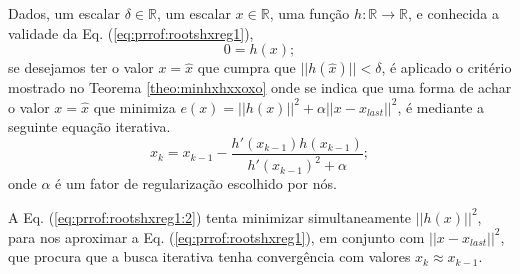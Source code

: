 \begin{myproofT}\label{proof:theo:rootshxreg}
Dados,
um escalar $\delta \in \mathbb{R}$, 
um escalar $x \in \mathbb{R}$, 
uma função $h:\mathbb{R} \rightarrow \mathbb{R}$, e 
conhecida a validade da Eq. (\ref{eq:prrof:rootshxreg1}),
\begin{equation}\label{eq:prrof:rootshxreg1}
0=h(x);
\end{equation}
se desejamos ter o valor $x=\hat{x}$ que cumpra que $||h(\hat{x})||<\delta$, 
é aplicado o critério mostrado no Teorema \ref{theo:minhxhxxoxo} onde se indica que uma forma de achar o valor 
$x=\hat{x}$ que minimiza $e(x)=||h(x)||^2+\alpha||x-x_{last}||^2$, é mediante a seguinte equação iterativa.  
\begin{equation}\label{eq:prrof:rootshxreg1:2}
x_{k}=x_{k-1}-\frac{h'(x_{k-1}) h(x_{k-1})}{h'(x_{k-1})^2+\alpha};
\end{equation}
onde $\alpha$ é um fator de regularização escolhido por nós.

A Eq. (\ref{eq:prrof:rootshxreg1:2}) tenta minimizar simultaneamente  $||h(x)||^2$,
para nos aproximar a Eq. (\ref{eq:prrof:rootshxreg1}), em conjunto com $||x-x_{last}||^2$,
que procura que a busca iterativa tenha convergência com valores $x_{k}\approx x_{k-1}$. 
\end{myproofT}
